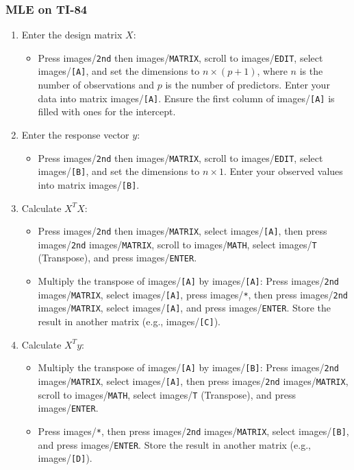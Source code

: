 \documentclass{article}
\newcommand{\code}[1]{images/\colorbox{light-gray}{\texttt{#1}}}
\begin{document}
\subsubsection{MLE on TI-84}

\begin{enumerate}
    \item Enter the design matrix $X$:
    \begin{itemize}
        \item Press \code{2nd} then \code{MATRIX}, scroll to \code{EDIT}, select \code{[A]}, and set the dimensions to $n \times (p+1)$, where $n$ is the number of observations and $p$ is the number of predictors. Enter your data into matrix \code{[A]}. Ensure the first column of \code{[A]} is filled with ones for the intercept.
    \end{itemize}
    \item Enter the response vector $y$:
    \begin{itemize}
        \item Press \code{2nd} then \code{MATRIX}, scroll to \code{EDIT}, select \code{[B]}, and set the dimensions to $n \times 1$. Enter your observed values into matrix \code{[B]}.
    \end{itemize}
    \item Calculate $X^T X$:
    \begin{itemize}
        \item Press \code{2nd} then \code{MATRIX}, select \code{[A]}, then press \code{2nd} \code{MATRIX}, scroll to \code{MATH}, select \code{T} (Transpose), and press \code{ENTER}.
        \item Multiply the transpose of \code{[A]} by \code{[A]}: Press \code{2nd} \code{MATRIX}, select \code{[A]}, press \code{*}, then press \code{2nd} \code{MATRIX}, select \code{[A]}, and press \code{ENTER}. Store the result in another matrix (e.g., \code{[C]}).
    \end{itemize}
    \item Calculate $X^T y$:
    \begin{itemize}
        \item Multiply the transpose of \code{[A]} by \code{[B]}: Press \code{2nd} \code{MATRIX}, select \code{[A]}, then press \code{2nd} \code{MATRIX}, scroll to \code{MATH}, select \code{T} (Transpose), and press \code{ENTER}.
        \item Press \code{*}, then press \code{2nd} \code{MATRIX}, select \code{[B]}, and press \code{ENTER}. Store the result in another matrix (e.g., \code{[D]}).

\end{itemize}
\end{enumerate}
\end{document}
